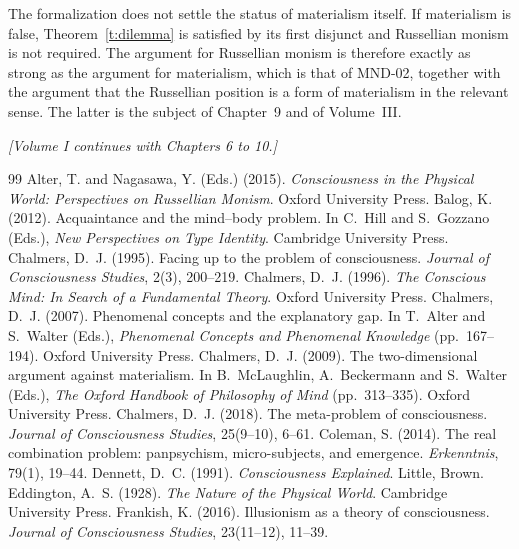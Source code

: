 \documentclass{situationist-preprint}
\begin{document}
The formalization does not settle the status of materialism itself. If materialism is false, Theorem~\ref{t:dilemma} is satisfied by its first disjunct and Russellian monism is not required. The argument for Russellian monism is therefore exactly as strong as the argument for materialism, which is that of MND-02, together with the argument that the Russellian position is a form of materialism in the relevant sense. The latter is the subject of Chapter~9 and of Volume~III.

\bigskip
\begin{center}\small\itshape [Volume I continues with Chapters 6 to 10.]\end{center}

\begin{thebibliography}{99}\small
{} Alter, T. and Nagasawa, Y. (Eds.) (2015). \emph{Consciousness in the Physical World: Perspectives on Russellian Monism}. Oxford University Press.
 Balog, K. (2012). Acquaintance and the mind--body problem. In C.~Hill and S.~Gozzano (Eds.), \emph{New Perspectives on Type Identity}. Cambridge University Press.
 Chalmers, D.~J. (1995). Facing up to the problem of consciousness. \emph{Journal of Consciousness Studies}, 2(3), 200--219.
 Chalmers, D.~J. (1996). \emph{The Conscious Mind: In Search of a Fundamental Theory}. Oxford University Press.
 Chalmers, D.~J. (2007). Phenomenal concepts and the explanatory gap. In T.~Alter and S.~Walter (Eds.), \emph{Phenomenal Concepts and Phenomenal Knowledge} (pp.~167--194). Oxford University Press.
 Chalmers, D.~J. (2009). The two-dimensional argument against materialism. In B.~McLaughlin, A.~Beckermann and S.~Walter (Eds.), \emph{The Oxford Handbook of Philosophy of Mind} (pp.~313--335). Oxford University Press.
 Chalmers, D.~J. (2018). The meta-problem of consciousness. \emph{Journal of Consciousness Studies}, 25(9--10), 6--61.
 Coleman, S. (2014). The real combination problem: panpsychism, micro-subjects, and emergence. \emph{Erkenntnis}, 79(1), 19--44.
 Dennett, D.~C. (1991). \emph{Consciousness Explained}. Little, Brown.
 Eddington, A.~S. (1928). \emph{The Nature of the Physical World}. Cambridge University Press.
 Frankish, K. (2016). Illusionism as a theory of consciousness. \emph{Journal of Consciousness Studies}, 23(11--12), 11--39.

\end{thebibliography}
\end{document}
